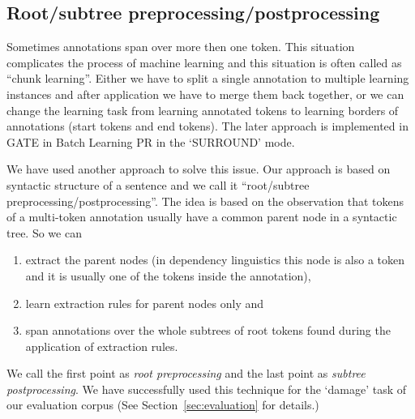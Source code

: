 \documentclass[runningheads,a4paper]{llncs}
\begin{document}

\subsection{Root/subtree preprocessing/postprocessing}
Sometimes annotations span over more then one token. This situation complicates the process of machine learning and this situation is often called as ``chunk learning''. Either we have to split a single annotation to multiple learning instances and after application we have to merge them back together, or we can change the learning task from learning annotated tokens to learning borders of annotations (start tokens and end tokens). The later approach is implemented in GATE in Batch Learning PR in the `SURROUND' mode.

We have used another approach to solve this issue. Our approach is based on syntactic structure of a sentence and we call it ``root/subtree preprocessing/postprocessing''. The idea is based on the observation that tokens of a multi-token annotation usually have a common parent node in a syntactic tree. So we can
\begin{enumerate}
	\item extract the parent nodes (in dependency linguistics this node is also a token and it is usually one of the tokens inside the annotation), 
	\item learn extraction rules for parent nodes only and 
	\item span annotations over the whole subtrees of root tokens found during the application of extraction rules.
\end{enumerate}
We call the first point as \emph{root preprocessing} and the last point as \emph{subtree postprocessing}. We have successfully used this technique for the `damage' task of our evaluation corpus (See Section~\ref{sec:evaluation} for details.)
\end{document}
